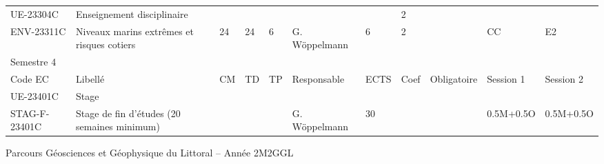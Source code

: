 \documentclass[a4paper,11pt]{article}
\begin{document}
{{\begin{tabular}{lllllllllll}
\rowcolor[HTML]{C0C0C0} 
UE-23304C                      & Enseignement disciplinaire                    &                           &                           &                           &                                    &                             & 2                           &                                    &                                  &                                  \\
ENV-23311C                     & Niveaux marins extrêmes et risques cotiers    & 24                        & 24                        & 6                         & G. Wöppelmann                      & 6                           & 2                           &                                    & CC                               & E2                               \\
\rowcolor[HTML]{656565} 
Semestre 4                     &                                               &                           &                           &                           &                                    &                             &                             &                                    &                                  &                                  \\
\rowcolor[HTML]{9B9B9B} 
Code EC                        & Libellé                                       & CM                        & TD                        & TP                        & Responsable                        & ECTS                        & Coef                        & Obligatoire                        & Session 1                        & Session 2                        \\
\rowcolor[HTML]{C0C0C0} 
UE-23401C                      & Stage                                         &                           &                           &                           &                                    &                             &                             &                                    &                                  &                                  \\
STAG-F-23401C                  & Stage de fin d'études (20 semaines minimum)   &                           &                           &                           & G. Wöppelmann                      & 30                          &                             &                                    & 0.5M+0.5O                        & 0.5M+0.5O                        \\
\end{tabular}}
}{Parcours Géosciences et Géophysique du Littoral -- Année 2}{M2GGL}
\end{document}
